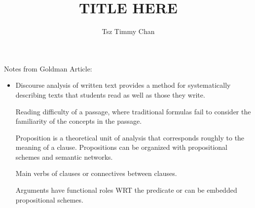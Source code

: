 \documentclass{TC}
\title{TITLE HERE}	%
\author{Tsz Timmy Chan}	%
\begin{document}
Notes from Goldman Article:
\begin{itemize}
\item Discourse analysis of written text provides a method for systematically describing texts that students read as well as those they write. 

	
\begin{definition}[Readability]
	Reading difficulty of a passage, where traditional formulas fail to consider the familiarity of the concepts in the passage.
\end{definition}
\begin{definition}
	Proposition is a theoretical unit of analysis that corresponds roughly to the meaning of a clause.  Propositions can be organized with propositional schemes and semantic networks.
\end{definition}

\begin{definition}
Main verbs of clauses or connectives between clauses.
\end{definition}

\begin{definition}
Arguments have functional roles WRT the predicate or can be embedded propositional schemes.
\end{definition}
\end{itemize}
\end{document}
